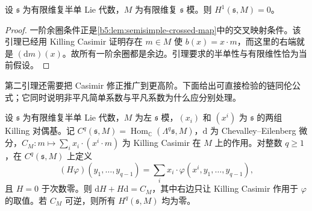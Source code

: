 \begin{theorem}\label{b5:thm:whitehead-first}
	设 \(\mathfrak s\) 为有限维复半单 Lie 代数，\(M\) 为有限维复 \(\mathfrak s\) 模。则 \(H^1(\mathfrak s,M)=0\)。
\end{theorem}
\begin{proof}
	一阶余圈条件正是\cref{b5:lem:semisimple-crossed-map}中的交叉映射条件。该引理已经用 Killing Casimir 证明存在 \(m\in M\) 使 \(b(x)=x\cdot m\)，而这里的右端就是 \((\mathrm{d}m)(x)\)。故所有一阶余圈都是余边。引理要求的半单性与有限维性恰为当前假设。
\end{proof}

第二引理还需要把 Casimir 修正推广到更高阶。下面给出可直接检验的链同伦公式；它同时说明非平凡简单系数与平凡系数为什么应分别处理。

\begin{lemma}\label{b5:lem:casimir-ce-homotopy}
	设 \(\mathfrak s\) 为有限维复半单 Lie 代数，\(M\) 为左 \(\mathfrak s\) 模，\((x_i)\) 和 \((x^i)\) 为 \(\mathfrak s\) 的两组 Killing 对偶基。记 \(C^q(\mathfrak s,M)=\operatorname{Hom}_{\mathbb C}(\Lambda^q\mathfrak s,M)\)，\(\mathrm{d}\) 为 Chevalley--Eilenberg 微分，\(C_M:m\mapsto\sum_i x_i\cdot(x^i\cdot m)\) 为 Killing Casimir 在 \(M\) 上的作用。对整数 \(q\ge1\)，在 \(C^q(\mathfrak s,M)\) 上定义
	\[
		(H\varphi)(y_1,\ldots,y_{q-1}) =\sum_i x_i\cdot\varphi(x^i,y_1,\ldots,y_{q-1}),
	\]
	且 \(H=0\) 于次数零。则 \(\mathrm{d}H+H\mathrm{d}=C_M\)，其中右边只让 Killing Casimir 作用于 \(\varphi\) 的取值。若 \(C_M\) 可逆，则所有 \(H^q(\mathfrak s,M)\) 均为零。
\end{lemma}
